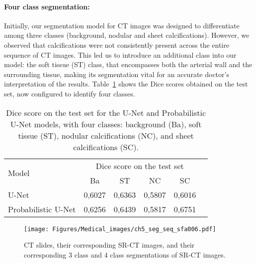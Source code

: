 \paragraph*{Four class segmentation: }
Initially, our segmentation model for CT images was designed to differentiate
among three classes (background, nodular and sheet  calcifications). 
However, we observed that calcifications were not
consistently present across the entire sequence of CT images.
This led us to introduce an additional class into our model: the soft tissue (ST) class,
that  encompasses both the arterial wall and the surrounding tissue, making its
segmentation vital for an accurate doctor's interpretation of the results.
Table~\ref{tab:dice_score_test_4} shows the Dice
scores obtained on the test set,
now configured to identify four classes.
\begin{table}[htb!]
    \begin{center}
    \begin{tabular}{|l|r|r|r|r|r|}
    \hline
    \multirow{2}{*}{Model}  &\multicolumn{4}{c|}{Dice score on the test set}\\
    \cline{2-5} 
      & \multicolumn{1}{c|}{Ba}  & \multicolumn{1}{c|}{ST} & \multicolumn{1}{c|}{NC} & \multicolumn{1}{c|}{SC} \\ 
      \hline \hline
      \multicolumn{1}{|l|}{U-Net}      & 0,6027       & 0,6363  & 0,5807  & 0,6016   \\ \hline
      \multicolumn{1}{|l|}{Probabilistic U-Net}    & 0,6256     & 0,6439  & 0,5817  & 0,6751\\ \hline
      \end{tabular}
      \vspace{-0.2cm}
      \caption{Dice score on the test set for the U-Net and Probabilistic U-Net models, 
      with four classes: background (Ba), soft tissue (ST), 
      nodular calcifications (NC), and sheet calcifications (SC).}      
    \label{tab:dice_score_test_4}
    \end{center}
\end{table}

\begin{figure}[htb!]
    \centering
    \texttt{[image: Figures/Medical\_images/ch5\_seg\_seq\_sfa006.pdf]}
    \caption{CT slides, their corresponding SR-CT images, and their corresponding
    3 class and 4 class segmentations of  SR-CT images.}
    \label{fig:proba_unet_sr_ct_more_classes}
\end{figure}

